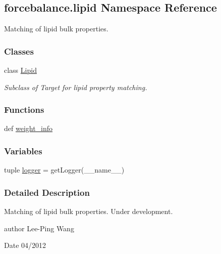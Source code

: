 \hypertarget{namespaceforcebalance_1_1lipid}{\subsection{forcebalance.\-lipid Namespace Reference}
\label{namespaceforcebalance_1_1lipid}
}


Matching of lipid bulk properties.  


\subsubsection*{Classes}
\begin{DoxyCompactItemize}
\item 
class \hyperlink{classforcebalance_1_1lipid_1_1Lipid}{Lipid}
\begin{DoxyCompactList}\small\item\em Subclass of Target for lipid property matching. \end{DoxyCompactList}\end{DoxyCompactItemize}
\subsubsection*{Functions}
\begin{DoxyCompactItemize}
\item 
def \hyperlink{namespaceforcebalance_1_1lipid_ad5d58c1eb0fb86e1587a892467634a44}{weight\-\_\-info}
\end{DoxyCompactItemize}
\subsubsection*{Variables}
\begin{DoxyCompactItemize}
\item 
tuple \hyperlink{namespaceforcebalance_1_1lipid_adafbe32d6a2808045fbf9e92771dc2fc}{logger} = get\-Logger(\-\_\-\-\_\-name\-\_\-\-\_\-)
\end{DoxyCompactItemize}


\subsubsection{Detailed Description}
Matching of lipid bulk properties. Under development.

author Lee-\/\-Ping Wang \begin{DoxyDate}{Date}
04/2012 
\end{DoxyDate}


